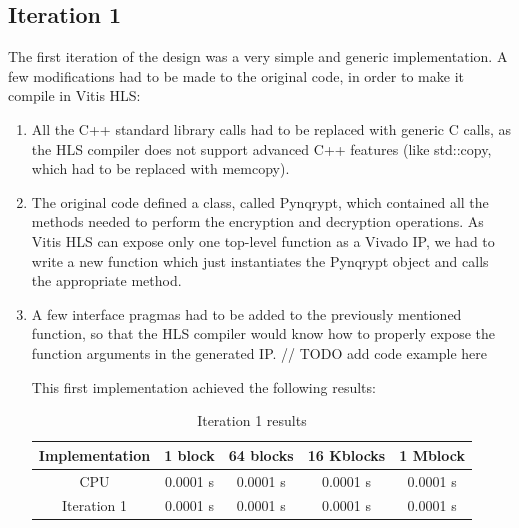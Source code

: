 \documentclass[12pt,oneside,a4paper]{article}
\begin{document}
\subsection{Iteration 1} \label{subsec:iter1}
The first iteration of the design was a very simple and generic implementation. A few modifications had to be made to the original code, in order to make it compile in Vitis HLS:
\begin{enumerate}
	\item All the C++ standard library calls had to be replaced with generic C calls, as the HLS compiler does not support advanced C++ features (like std::copy, which had to be replaced with memcopy).
	\item The original code defined a class, called Pynqrypt, which contained all the methods needed to perform the encryption and decryption operations. As Vitis HLS can expose only one top-level function as a Vivado IP, we had to write a new function which just instantiates the Pynqrypt object and calls the appropriate method.
	\item A few interface pragmas had to be added to the previously mentioned function, so that the HLS compiler would know how to properly expose the function arguments in the generated IP.
// TODO add code example here

This first implementation achieved the following results:
\begin{table}
	\caption{Iteration 1 results}
	\centering
	\begin{tabular}{ccccc}
		\toprule
		Implementation & 1 block & 64 blocks & 16 Kblocks & 1 Mblock \\
		\midrule
		CPU & 0.0001 s & 0.0001 s & 0.0001 s & 0.0001 s \\
		Iteration 1 & 0.0001 s & 0.0001 s & 0.0001 s & 0.0001 s \\
		\bottomrule
	\end{tabular}
\end{table}
\end{enumerate}


\printbibliography
\end{document}
